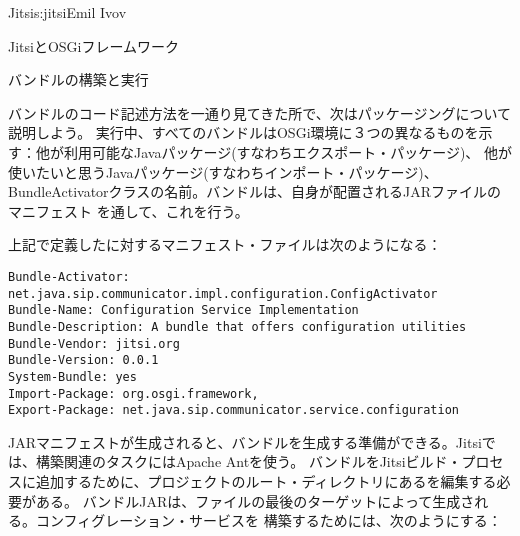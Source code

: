 \begin{aosachapter}{Jitsi}{s:jitsi}{Emil Ivov}
\begin{aosasect1}{JitsiとOSGiフレームワーク}

\end{aosasect1}

\begin{aosasect1}{バンドルの構築と実行}

バンドルのコード記述方法を一通り見てきた所で、次はパッケージングについて説明しよう。
実行中、すべてのバンドルはOSGi環境に３つの異なるものを示す：他が利用可能なJavaパッケージ(すなわちエクスポート・パッケージ)、
他が使いたいと思うJavaパッケージ(すなわちインポート・パッケージ)、BundleActivatorクラスの名前。バンドルは、自身が配置されるJARファイルのマニフェスト
を通して、これを行う。

上記で定義したに対するマニフェスト・ファイルは次のようになる：

\begin{verbatim}
Bundle-Activator: net.java.sip.communicator.impl.configuration.ConfigActivator
Bundle-Name: Configuration Service Implementation
Bundle-Description: A bundle that offers configuration utilities
Bundle-Vendor: jitsi.org
Bundle-Version: 0.0.1
System-Bundle: yes
Import-Package: org.osgi.framework,
Export-Package: net.java.sip.communicator.service.configuration
\end{verbatim}

JARマニフェストが生成されると、バンドルを生成する準備ができる。Jitsiでは、構築関連のタスクにはApache Antを使う。
バンドルをJitsiビルド・プロセスに追加するために、プロジェクトのルート・ディレクトリにあるを編集する必要がある。
バンドルJARは、ファイルの最後のターゲットによって生成される。コンフィグレーション・サービスを
構築するためには、次のようにする：


\end{aosasect1}
\end{aosachapter}
